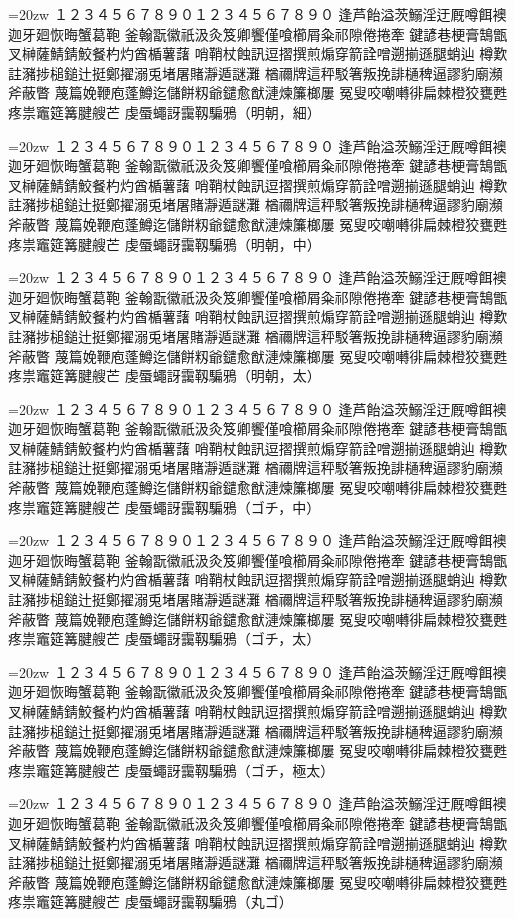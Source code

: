 \documentclass{jsarticle}
\begin{document}
\def\R{\par\noindent%
  \vbox{\LARGE\hsize=20zw\noindent\kanjiskip=0pt
  １２３４５６７８９０１２３４５６７８９０
  逢芦飴溢茨鰯淫迂厩噂餌襖迦牙廻恢晦蟹葛鞄
  釜翰翫徽祇汲灸笈卿饗僅喰櫛屑粂祁隙倦捲牽
  鍵諺巷梗膏鵠甑叉榊薩鯖錆鮫餐杓灼酋楯薯藷
  哨鞘杖蝕訊逗摺撰煎煽穿箭詮噌遡揃遜腿蛸辿
  樽歎註瀦捗槌鎚辻挺鄭擢溺兎堵屠賭瀞遁謎灘
  楢禰牌這秤駁箸叛挽誹樋稗逼謬豹廟瀕斧蔽瞥
  蔑篇娩鞭庖蓬鱒迄儲餅籾爺鑓愈猷漣煉簾榔屢
  冤叟咬嘲囀徘扁棘橙狡甕甦疼祟竈筵篝腱艘芒
  虔蜃蠅訝靄靱騙鴉}}

\selectfont \R（明朝，細）
\selectfont \R（明朝，中）
\selectfont \R（明朝，太）
\selectfont \R（ゴチ，中）
\selectfont \R（ゴチ，太）
\selectfont \R（ゴチ，極太）
\selectfont \R（丸ゴ）
\end{document}
